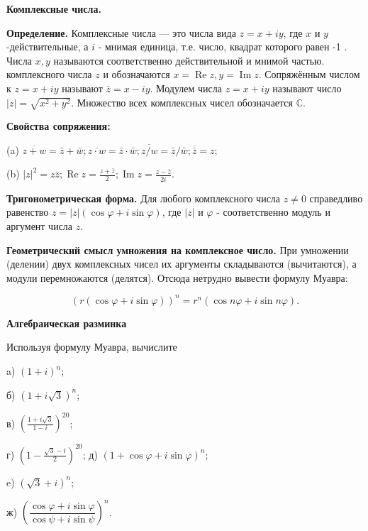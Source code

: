 \centerline{\bf \Huge Комплексные числа. }

\begin{flushright}
        \scriptsize{}
\end{flushright}

\textbf{Определение.} Комплексные числа --- это числа вида $z=x+i y$, где $x$ и $y$-действительные, а $i$ - мнимая единица, т.е. число, квадрат которого равен -1 . Числа $x, y$ называются соответственно действительной и мнимой частью. комплексного числа $z$ и обозначаются $x=\operatorname{Re} z, y=\operatorname{Im} z$. Сопряжённым числом к $z=x+i y$ называют $\bar{z}=x-i y$. Модулем числа $z=x+i y$ называют число $|z|=\sqrt{x^2+y^2}$. Множество всех комплексных чисел обозначается $\mathbb{C}$.

\textbf{Свойства сопряжения:}

(a) $\overline{z+w}=\bar{z}+\bar{w} ; \overline{z \cdot w}=\bar{z} \cdot \bar{w} ; \overline{z / w}=\bar{z} / \bar{w} ; \overline{\bar{z}}=z$;

(b) $|z|^2=z \bar{z} ; \operatorname{Re} z=\frac{z+\bar{z}}{2} ; \operatorname{Im} z=\frac{z-\bar{z}}{2 i}$.

\textbf{Тригонометрическая форма.}
Для любого комплексного числа $z \neq 0$ справедливо равенство $z=|z|(\cos \varphi+i \sin \varphi)$, где $|z|$ и $\varphi$ - соответственно модуль и аргумент числа $z$.

\textbf{Геометрический смысл умножения на комплексное число.}
При умножении (делении) двух комплексных чисел их аргументы складываются (вычитаются), а модули перемножаются (делятся). Отсюда нетрудно вывести формулу Муавра:

$$
(r(\cos \varphi+i \sin \varphi))^n=r^n(\cos n \varphi+i \sin n \varphi) .
$$

\newpage

\hspace{3mm}

\textbf{\Large Алгебраическая разминка}

Используя формулу Муавра, вычислите

a) $(1+i)^n$;

б) $(1+i \sqrt{3})^n$;

в) $\left(\frac{1+i \sqrt{3}}{1-i}\right)^{20}$;

г) $\left(1-\frac{\sqrt{3}-i}{2}\right)^{20}$; д) $(1+\cos \varphi+i \sin\varphi)^n$;

e) $(\sqrt{3}+i)^n$;

ж) $\left(\dfrac{\cos \varphi+i \sin \varphi}{\cos \psi+i \sin \psi}\right)^n$.


